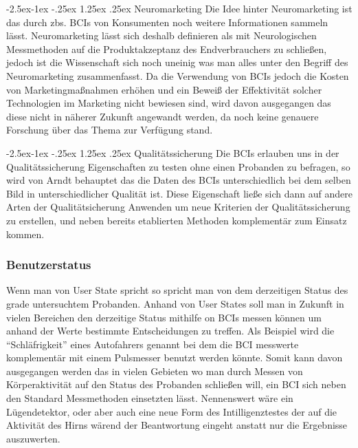 \documentclass[11pt,ngerman,parskip=half]{scrartcl}
\makeatletter
\renewcommand\paragraph{\@startsection{paragraph}{4}{\z@}%
            {-2.5ex\@plus -1ex \@minus -.25ex}%
            {1.25ex \@plus .25ex}%
            {\normalfont\normalsize\bfseries}}
\makeatother
\begin{document}
\paragraph{Neuromarketing}
Die Idee hinter Neuromarketing ist das durch zbs. BCIs von Konsumenten noch
weitere Informationen sammeln lässt. Neuromarketing lässt sich deshalb
definieren als mit Neurologischen Messmethoden auf die Produktakzeptanz des
Endverbrauchers zu schließen, jedoch ist die Wissenschaft sich noch uneinig
was man alles unter den Begriff des Neuromarketing
zusammenfasst\parencite{marketing,beyond}. Da die Verwendung von BCIs jedoch
die Kosten von Marketingmaßnahmen erhöhen und ein Beweiß der Effektivität
solcher Technologien im Marketing nicht bewiesen sind, wird davon ausgegangen
das diese nicht in näherer Zukunft angewandt werden, da noch keine genauere
Forschung über das Thema zur Verfügung stand.

\paragraph{Qualitätssicherung}
Die BCIs erlauben uns in der Qualitätssicherung Eigenschaften zu testen ohne
einen Probanden zu befragen, so wird von Arndt behauptet das die Daten des
BCIs unterschiedlich bei dem selben Bild in unterschiedlicher Qualität
ist\parencite{video}. Diese Eigenschaft ließe sich dann auf andere Arten der
Qualitätsicherung Anwenden um neue Kriterien der Qualitätssicherung zu
erstellen, und neben bereits etablierten Methoden komplementär zum Einsatz
kommen.

\subsubsection{Benutzerstatus}
Wenn man von User State spricht so spricht man von dem derzeitigen Status des
grade untersuchtem Probanden. Anhand von User States soll man in Zukunft in
vielen Bereichen den derzeitige Status mithilfe on BCIs messen können um
anhand der Werte bestimmte Entscheidungen zu treffen. Als Beispiel wird die
\enquote{Schläfrigkeit} eines Autofahrers genannt bei dem die BCI messwerte
komplementär mit einem Pulsmesser benutzt werden könnte. Somit kann davon
ausgegangen werden das in vielen Gebieten wo man durch Messen von
Körperaktivität auf den Status des Probanden schließen will, ein BCI sich
neben den Standard Messmethoden einsetzten lässt. Nennenswert wäre ein
Lügendetektor, oder aber auch eine neue Form des Intilligenztestes der auf
die Aktivität des Hirns wärend der Beantwortung eingeht anstatt nur die
Ergebnisse auszuwerten.\parencite[vgl 3.2]{beyond}
\end{document}
